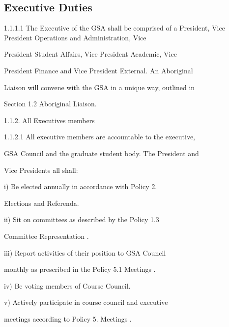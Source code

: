 \subsection{Executive Duties}

  

1.1.1.1           The  Executive  of  the  GSA  shall  be  comprised  of  a President, Vice President Operations and Administration, Vice  

         President   Student   Affairs,   Vice   President   Academic,   Vice  

         President Finance and Vice President External. An Aboriginal  

         Liaison will convene with the GSA in a unique way, outlined in  

         Section 1.2 Aboriginal Liaison.   

  

1.1.2. All Executives members  

  

1.1.2.1           All executive members are accountable to the executive,  

         GSA Council and the graduate student body. The President and  

         Vice Presidents all shall:   

  

         i)       Be     elected      annually       in    accordance         with     Policy       2.  

                  Elections and Referenda.   

  

         ii)       Sit   on   committees   as   described   by   the   Policy   1.3  



                   Committee Representation .   

  

         iii)     Report   activities   of   their   position   to   GSA   Council  

                  monthly as prescribed in the Policy 5.1 Meetings .   

  

         iv)      Be voting members of Course Council.   

  

         v)       Actively   participate   in   course   council   and   executive  

                  meetings according to Policy 5. Meetings .   

